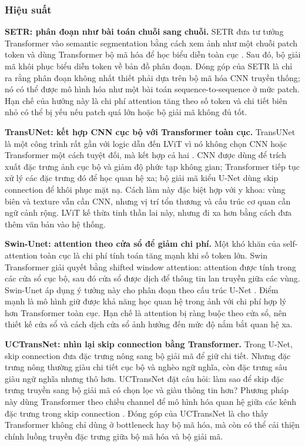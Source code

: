 \subsubsection{Hiệu suất}

\textbf{SETR: phân đoạn như bài toán chuỗi sang chuỗi.} SETR đưa tư tưởng Transformer vào semantic segmentation bằng cách xem ảnh như một chuỗi patch token và dùng Transformer bộ mã hóa để học biểu diễn toàn cục \cite{zheng2021setr}. Sau đó, bộ giải mã khôi phục biểu diễn token về bản đồ phân đoạn. Đóng góp của SETR là chỉ ra rằng phân đoạn không nhất thiết phải dựa trên bộ mã hóa CNN truyền thống; nó có thể được mô hình hóa như một bài toán sequence-to-sequence ở mức patch. Hạn chế của hướng này là chi phí attention tăng theo số token và chi tiết biên nhỏ có thể bị yếu nếu patch quá lớn hoặc bộ giải mã không đủ tốt.

\textbf{TransUNet: kết hợp CNN cục bộ với Transformer toàn cục.} TransUNet là một công trình rất gần với logic dẫn đến LViT vì nó không chọn CNN hoặc Transformer một cách tuyệt đối, mà kết hợp cả hai \cite{chen2021transunet}. CNN được dùng để trích xuất đặc trưng ảnh cục bộ và giảm độ phức tạp không gian; Transformer tiếp tục xử lý các đặc trưng đó để học quan hệ xa; bộ giải mã kiểu U-Net dùng skip connection để khôi phục mặt nạ. Cách làm này đặc biệt hợp với y khoa: vùng biên và texture vẫn cần CNN, nhưng vị trí tổn thương và cấu trúc cơ quan cần ngữ cảnh rộng. LViT kế thừa tinh thần lai này, nhưng đi xa hơn bằng cách đưa thêm văn bản vào hệ thống.

\textbf{Swin-Unet: attention theo cửa sổ để giảm chi phí.} Một khó khăn của self-attention toàn cục là chi phí tính toán tăng mạnh khi số token lớn. Swin Transformer giải quyết bằng shifted window attention: attention được tính trong các cửa sổ cục bộ, sau đó cửa sổ được dịch để thông tin lan truyền giữa các vùng. Swin-Unet áp dụng ý tưởng này cho phân đoạn theo cấu trúc U-Net \cite{cao2021swinunet}. Điểm mạnh là mô hình giữ được khả năng học quan hệ trong ảnh với chi phí hợp lý hơn Transformer toàn cục. Hạn chế là attention bị ràng buộc theo cửa sổ, nên thiết kế cửa sổ và cách dịch cửa sổ ảnh hưởng đến mức độ nắm bắt quan hệ xa.

\textbf{UCTransNet: nhìn lại skip connection bằng Transformer.} Trong U-Net, skip connection đưa đặc trưng nông sang bộ giải mã để giữ chi tiết. Nhưng đặc trưng nông thường giàu chi tiết cục bộ và nghèo ngữ nghĩa, còn đặc trưng sâu giàu ngữ nghĩa nhưng thô hơn. UCTransNet đặt câu hỏi: làm sao để skip đặc trưng truyền sang bộ giải mã có chọn lọc và giàu thông tin hơn? Phương pháp này dùng Transformer theo chiều channel để mô hình hóa quan hệ giữa các kênh đặc trưng trong skip connection \cite{wang2021uctransnet}. Đóng góp của UCTransNet là cho thấy Transformer không chỉ dùng ở bottleneck hay bộ mã hóa, mà còn có thể cải thiện chính luồng truyền đặc trưng giữa bộ mã hóa và bộ giải mã.

